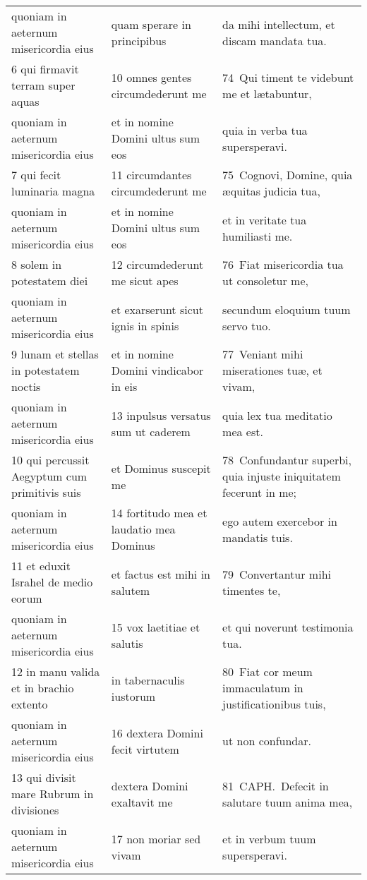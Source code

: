 \documentclass{article}
\begin{document}
\begin{longtable}{@{}p{}p{}p{}@{}}
quoniam in aeternum misericordia eius	&	quam sperare in principibus	&	da mihi intellectum, et discam mandata tua.	\\
6 qui firmavit terram super aquas	&	10 omnes gentes circumdederunt me	&	74 Qui timent te videbunt me et lætabuntur,	\\
quoniam in aeternum misericordia eius	&	et in nomine Domini ultus sum eos	&	quia in verba tua supersperavi.	\\
7 qui fecit luminaria magna	&	11 circumdantes circumdederunt me	&	75 Cognovi, Domine, quia æquitas judicia tua,	\\
quoniam in aeternum misericordia eius	&	et in nomine Domini ultus sum eos	&	et in veritate tua humiliasti me.	\\
8 solem in potestatem diei	&	12 circumdederunt me sicut apes	&	76 Fiat misericordia tua ut consoletur me,	\\
quoniam in aeternum misericordia eius	&	et exarserunt sicut ignis in spinis	&	secundum eloquium tuum servo tuo.	\\
9 lunam et stellas in potestatem noctis	&	et in nomine Domini vindicabor in eis	&	77 Veniant mihi miserationes tuæ, et vivam,	\\
quoniam in aeternum misericordia eius	&	13 inpulsus versatus sum ut caderem	&	quia lex tua meditatio mea est.	\\
10 qui percussit Aegyptum cum primitivis suis	&	et Dominus suscepit me	&	78 Confundantur superbi, quia injuste iniquitatem fecerunt in me;	\\
quoniam in aeternum misericordia eius	&	14 fortitudo mea et laudatio mea Dominus	&	ego autem exercebor in mandatis tuis.	\\
11 et eduxit Israhel de medio eorum	&	et factus est mihi in salutem	&	79 Convertantur mihi timentes te,	\\
quoniam in aeternum misericordia eius	&	15 vox laetitiae et salutis	&	et qui noverunt testimonia tua.	\\
12 in manu valida et in brachio extento	&	in tabernaculis iustorum	&	80 Fiat cor meum immaculatum in justificationibus tuis,	\\
quoniam in aeternum misericordia eius	&	16 dextera Domini fecit virtutem	&	ut non confundar.	\\
13 qui divisit mare Rubrum in divisiones	&	dextera Domini exaltavit me	&	81 CAPH. Defecit in salutare tuum anima mea,	\\
quoniam in aeternum misericordia eius	&	17 non moriar sed vivam	&	et in verbum tuum supersperavi.	\\

\end{longtable}
\end{document}
